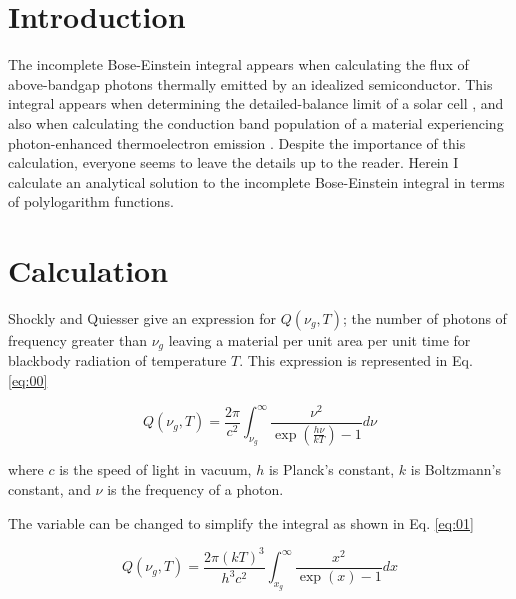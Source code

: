 \documentclass[letterpaper,12pt]{article}
\title{\Title}
\author{\AuthorName}
\begin{document}
\maketitle


\begin{abstract}

\end{abstract}


\section{Introduction}
The incomplete Bose-Einstein integral appears when calculating the flux of above-bandgap photons thermally emitted by an idealized semiconductor. This integral appears when determining the detailed-balance limit of a solar cell \cite{10.1063/1.1736034}, and also when calculating the conduction band population of a material experiencing photon-enhanced thermoelectron emission \cite{10.1038/nmat2814}. Despite the importance of this calculation, everyone seems to leave the details up to the reader. Herein I calculate an analytical solution to the incomplete Bose-Einstein integral in terms of polylogarithm functions.

\section{Calculation}
Shockly and Quiesser \cite{10.1063/1.1736034} give an expression for $Q(\nu_{g}, T)$; the number of photons of frequency greater than $\nu_{g}$ leaving a material per unit area per unit time for blackbody radiation of temperature $T$. This expression is represented in Eq. \ref{eq:00}

\begin{equation} \label{eq:00}
Q(\nu_{g}, T) = \frac{2\pi}{c^{2}} \int_{\nu_{g}}^{\infty} \frac{\nu^{2}}{\exp\left( \frac{h \nu}{kT} \right) - 1} d\nu
\end{equation}

\noindent where $c$ is the speed of light in vacuum, $h$ is Planck's constant, $k$ is Boltzmann's constant, and $\nu$ is the frequency of a photon.

The variable can be changed to simplify the integral as shown in Eq. \ref{eq:01}

\begin{equation} \label{eq:01}
Q(\nu_{g}, T) = \frac{2\pi (kT)^{3}}{h^{3} c^{2}} \int_{x_{g}}^{\infty} \frac{x^{2}}{\exp(x) - 1} dx
\end{equation}
\end{document}
